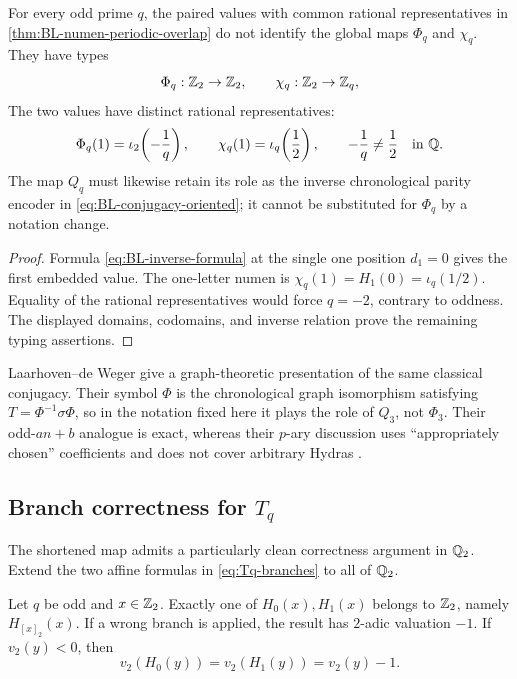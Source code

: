 \begin{corollary}
\label{cor:BL-numen-global-nonidentity}
For every odd prime $q$, the paired values with common rational representatives
in
\cref{thm:BL-numen-periodic-overlap} do not identify the global maps
$\Phi_q$ and $\chi_q$.  They have types
\[
 \Phi_q:\mathbb Z_2\to\mathbb Z_2,
 \qquad
 \chi_q:\mathbb Z_2\to\mathbb Z_q,
\]
The two values have distinct rational representatives:
\begin{equation}
\label{eq:BL-numen-value-separation}
 \Phi_q(1)=\iota_2\!\left(-\frac1q\right),
 \qquad
 \chi_q(1)=\iota_q\!\left(\frac12\right),
 \qquad
 -\frac1q\ne\frac12\quad\text{in }\mathbb Q.
\end{equation}
The map $Q_q$ must likewise retain its role as the inverse chronological
parity encoder in \cref{eq:BL-conjugacy-oriented}; it cannot be substituted
for $\Phi_q$ by a notation change.
\end{corollary}

\begin{proof}
Formula \cref{eq:BL-inverse-formula} at the single one position $d_1=0$
gives the first embedded value.  The one-letter numen is
$\chi_q(1)=H_1(0)=\iota_q(1/2)$.  Equality of the rational representatives
would force $q=-2$, contrary to oddness.  The displayed domains, codomains,
and inverse relation prove the remaining typing assertions.
\end{proof}

Laarhoven--de Weger give a graph-theoretic presentation of the same classical
conjugacy.  Their symbol $\Phi$ is the chronological graph isomorphism
satisfying $T=\Phi^{-1}\sigma\Phi$, so in the notation fixed here it plays
the role of $Q_3$, not $\Phi_3$.  Their odd-$an+b$ analogue is exact, whereas
their $p$-ary discussion uses ``appropriately chosen'' coefficients and does
not cover arbitrary Hydras
\cite[Thms.~3.1 and~5.1 and Sec.~5.2]{LaarhovenDeWeger}.

\subsection{Branch correctness for \texorpdfstring{$T_q$}{Tq}}

The shortened map admits a particularly clean correctness argument in
$\mathbb Q_2$.  Extend the two affine formulas in \cref{eq:Tq-branches} to all of
$\mathbb Q_2$.

\begin{lemma}
\label{lem:one-correct-Tq-branch}
Let $q$ be odd and $x\in\mathbb Z_2$.  Exactly one of $H_0(x),H_1(x)$ belongs to
$\mathbb Z_2$, namely $H_{[x]_2}(x)$.  If a wrong branch is applied, the result has
$2$-adic valuation $-1$.  If $v_2(y)<0$, then
\[
 v_2(H_0(y))=v_2(H_1(y))=v_2(y)-1.
\]
\end{lemma}

